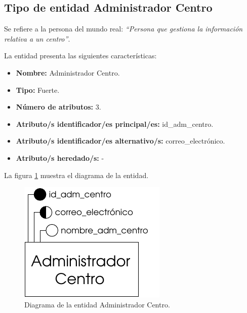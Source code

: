 \subsection{Tipo de entidad Administrador Centro}

   \begin{description}

   \item[Definición] Se refiere a la persona del mundo real: \emph{``Persona
   que gestiona la información relativa a un centro''}.

   \item[Características] La entidad presenta las siguientes características:
      \begin{itemize}
         \item \textbf{Nombre:} Administrador Centro.
         \item \textbf{Tipo:} Fuerte.
         \item \textbf{Número de atributos:} 3.
         \item \textbf{Atributo/s identificador/es principal/es:} id\_adm\_centro.
         \item \textbf{Atributo/s identificador/es alternativo/s:} correo\_electrónico.
         \item \textbf{Atributo/s heredado/s:} -
      \end{itemize}

   \item[Diagrama] La figura \ref{diagramaAdminCentro} muestra el diagrama de la entidad.
   \item \begin{figure}[!ht]
            \begin{center}
            \includegraphics[]{07.Modelo_Entidad-Interrelacion/7.2.Analisis_Entidades/diagramas/adm_centro.pdf}
            \caption{Diagrama de la entidad Administrador Centro.}
            \label{diagramaAdminCentro}
            \end{center}
         \end{figure}


\end{description}
